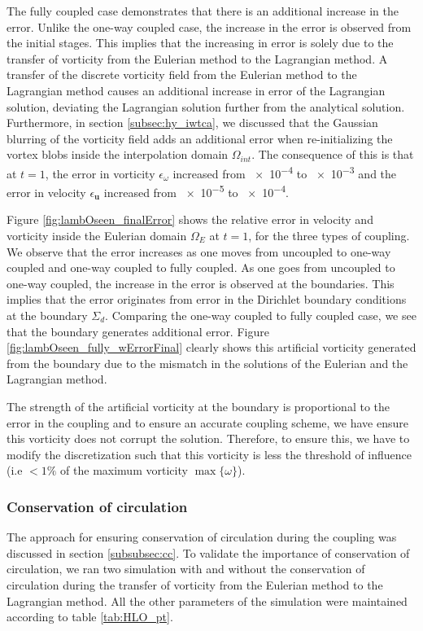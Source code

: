 The fully coupled case demonstrates that there is an additional increase in the error. Unlike the one-way coupled case, the increase in the error is observed from the initial stages. This implies that the increasing in error is solely due to the transfer of vorticity from the Eulerian method to the Lagrangian method. A transfer of the discrete vorticity field from the Eulerian method to the Lagrangian method causes an additional increase in error of the Lagrangian solution, deviating the Lagrangian solution further from the analytical solution. Furthermore, in section \ref{subsec:hy_iwtca}, we discussed that the Gaussian blurring of the vorticity field adds an additional error when re-initializing the vortex blobs inside the interpolation domain $\Omega_{int}$. The consequence of this is that at $t=1$, the error in vorticity $\epsilon_{\omega}$ increased from \num{e-4} to \num{e-3} and the error in velocity $\epsilon_{\mathbf{u}}$ increased from \num{e-5} to \num{e-4}.
	
Figure \ref{fig:lambOseen_finalError} shows the relative error in velocity and vorticity inside the Eulerian domain $\Omega_E$ at $t=1$, for the three types of coupling. We observe that the error increases as one moves from uncoupled to one-way coupled and one-way coupled to fully coupled. As one goes from uncoupled to one-way coupled, the increase in the error is observed at the boundaries. This implies that the error originates from error in the Dirichlet boundary conditions at the boundary $\Sigma_d$. Comparing the one-way coupled to fully coupled case, we see that the boundary generates additional error. Figure \ref{fig:lambOseen_fully_wErrorFinal} clearly shows this artificial vorticity generated from the boundary due to the mismatch in the solutions of the Eulerian and the Lagrangian method. 

The strength of the artificial vorticity at the boundary is proportional to the error in the coupling and to ensure an accurate coupling scheme, we have ensure this vorticity does not corrupt the solution. Therefore, to ensure this, we have to modify the discretization such that this vorticity is less the threshold of influence (i.e $<1\%$ of the maximum vorticity $\max\{\omega\}$).

\subsubsection{Conservation of circulation}
\label{subsubsec:coc}

The approach for ensuring conservation of circulation during the coupling was discussed in section \ref{subsubsec:cc}. To validate the importance of conservation of circulation, we ran two simulation with and without the conservation of circulation during the transfer of vorticity from the Eulerian method to the Lagrangian method. All the other parameters of the simulation were maintained according to table \ref{tab:HLO_pt}.

